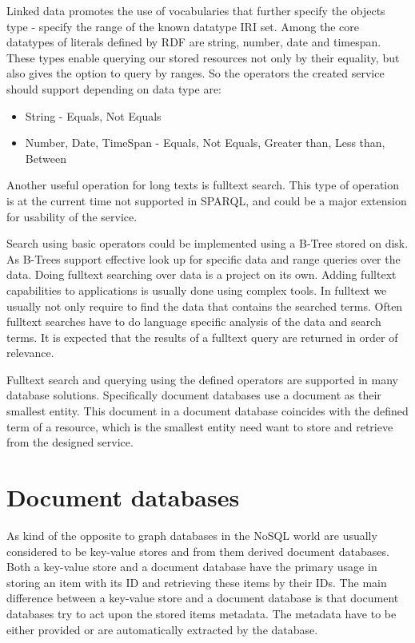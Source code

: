 Linked data promotes the use of vocabularies %
that further specify the objects type - specify the range of the known datatype IRI set.
Among the core datatypes of literals defined by RDF are string, number, date and timespan. These types enable querying our stored resources not only by their equality, but also gives the option to query by ranges. So the operators the created service should support depending on data type are:
\begin{itemize}
	\item String - Equals, Not Equals
	\item Number, Date, TimeSpan - Equals, Not Equals, Greater than, Less than, Between
\end{itemize}
Another useful operation for long texts is fulltext search. %
This type of operation is at the current time not supported in SPARQL, and could be a major extension for usability of the service.

Search using basic operators could be implemented using a B-Tree stored on disk. As B-Trees support effective look up for specific data and range queries over the data.
Doing fulltext searching over data is a project on its own. Adding fulltext capabilities to applications is usually done using complex tools. In fulltext we usually not only require to find the data that contains the searched terms. Often fulltext searches have to do language specific analysis of the data and search terms. It is expected that the results of a fulltext query are returned in order of relevance.

Fulltext search and querying using the defined operators are supported in many database solutions. Specifically document databases use a document as their smallest entity. This document in a document database coincides with the defined term of a resource, which is the smallest entity need want to store and retrieve from the designed service. 


\section{Document databases}
As kind of the opposite to graph databases in the NoSQL world are usually considered to be key-value stores and from them derived document databases. Both a key-value store and a document database have the primary usage in storing an item with its ID and retrieving these items by their IDs. The main difference between a key-value store and a document database is that document databases try to act upon the stored items metadata. The metadata have to be either provided or are automatically extracted by the database. 

